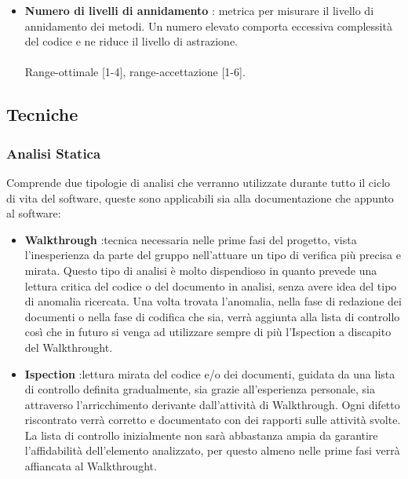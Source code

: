 \begin{itemize}
				\item \textbf{Numero di livelli di annidamento} \textnormal{: metrica per misurare il livello di annidamento dei metodi. Un numero elevato comporta eccessiva complessità del codice e ne riduce il livello di astrazione.\\ \\
				Range-ottimale [1-4], range-accettazione [1-6].}
			\end{itemize}
\subsection{Tecniche}
\subsubsection{Analisi Statica}
Comprende due tipologie di analisi che verranno utilizzate durante tutto il ciclo di vita del software, queste sono applicabili sia alla documentazione che appunto al software:
\begin{itemize}
\item \textbf{Walkthrough} :tecnica necessaria nelle prime fasi del progetto, vista l'inesperienza da parte del gruppo nell'attuare un tipo di verifica più precisa e mirata. Questo tipo di analisi è molto dispendioso in quanto prevede una lettura critica del codice o del documento in analisi, senza avere idea del tipo di anomalia ricercata. Una volta trovata l'anomalia, nella fase di redazione dei documenti o nella fase di codifica che sia, verrà aggiunta alla lista di controllo così che in futuro si venga ad utilizzare sempre di più l'Ispection a discapito del Walkthrought.
\item \textbf{Ispection} :lettura mirata del codice e/o dei documenti, guidata da una
lista di controllo definita gradualmente, sia grazie all'esperienza personale, sia attraverso l'arricchimento derivante dall'attività di Walkthrough. Ogni difetto riscontrato verrà corretto e documentato con dei rapporti sulle attività svolte. La lista di controllo inizialmente non sarà abbastanza ampia da garantire l'affidabilità dell'elemento analizzato, per questo almeno nelle prime fasi verrà affiancata al Walkthrought.
\end{itemize}
